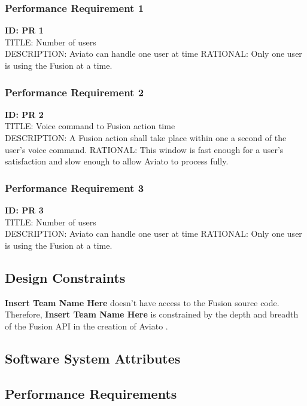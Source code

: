 \documentclass[onecolumn, draftclsnofoot,10pt, compsoc]{IEEEtran}
\def \CapstoneTeamName{\textbf{Insert Team Name Here} }
\def \botname{Aviato }
\begin{document}
        \subsubsection{Performance Requirement 1}
    	\textbf{ID: PR 1} \\
        TITLE: Number  of users \\
        DESCRIPTION: \botname can handle one user at time
        RATIONAL: Only one user is using the Fusion at a time. 
        
        \subsubsection{Performance Requirement 2}
    	\textbf{ID: PR 2} \\
        TITLE: Voice command to Fusion action time \\
        DESCRIPTION: A Fusion action shall take place within one a second of the user's voice command.
        RATIONAL: This window is fast enough for a user's satisfaction and slow enough to allow \botname to process fully.
        
        \subsubsection{Performance Requirement 3}
    	\textbf{ID: PR 3} \\
        TITLE: Number  of users \\
        DESCRIPTION: \botname can handle one user at time
        RATIONAL: Only one user is using the Fusion at a time. 
        
    \subsection{Design Constraints}
    	\CapstoneTeamName doesn't have access to the Fusion source code. Therefore, \CapstoneTeamName is constrained by the depth and breadth of the Fusion API in the creation of \botname.
        
    \subsection{Software System Attributes}
    
    
    
    \subsection{Performance Requirements}
\end{document}

